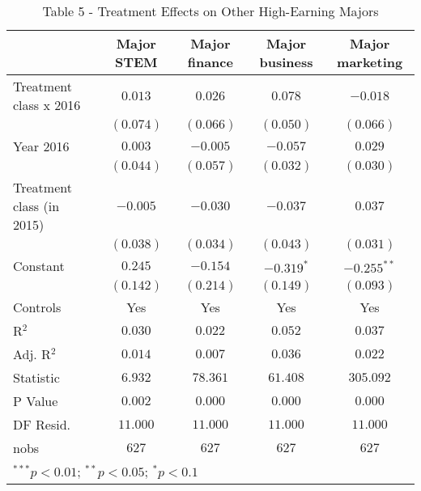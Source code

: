 
\begin{table}
\caption{Table 5 - Treatment Effects on Other High-Earning Majors}
\begin{center}
\begin{tabular}{l c c c c}
\hline
 & Major STEM & Major finance & Major business & Major marketing \\
\hline
Treatment class x 2016    & $0.013$   & $0.026$   & $0.078$      & $-0.018$      \\
                          & $(0.074)$ & $(0.066)$ & $(0.050)$    & $(0.066)$     \\
Year 2016                 & $0.003$   & $-0.005$  & $-0.057$     & $0.029$       \\
                          & $(0.044)$ & $(0.057)$ & $(0.032)$    & $(0.030)$     \\
Treatment class (in 2015) & $-0.005$  & $-0.030$  & $-0.037$     & $0.037$       \\
                          & $(0.038)$ & $(0.034)$ & $(0.043)$    & $(0.031)$     \\
Constant                  & $0.245$   & $-0.154$  & $-0.319^{*}$ & $-0.255^{**}$ \\
                          & $(0.142)$ & $(0.214)$ & $(0.149)$    & $(0.093)$     \\
\hline
Controls                  & Yes       & Yes       & Yes          & Yes           \\
R$^2$                     & $0.030$   & $0.022$   & $0.052$      & $0.037$       \\
Adj. R$^2$                & $0.014$   & $0.007$   & $0.036$      & $0.022$       \\
Statistic                 & $6.932$   & $78.361$  & $61.408$     & $305.092$     \\
P Value                   & $0.002$   & $0.000$   & $0.000$      & $0.000$       \\
DF Resid.                 & $11.000$  & $11.000$  & $11.000$     & $11.000$      \\
nobs                      & $627$     & $627$     & $627$        & $627$         \\
\hline
\multicolumn{5}{l}{\scriptsize{$^{***}p<0.01$; $^{**}p<0.05$; $^{*}p<0.1$}}
\end{tabular}
\label{table:coefficients}
\end{center}
\end{table}
